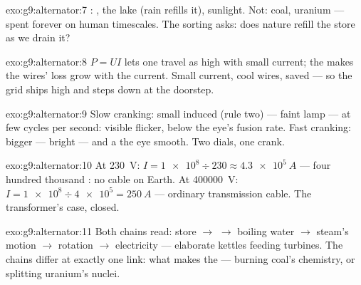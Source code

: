\begin{solution}{exo:g9:alternator:7}
: , the lake (rain refills it), sunlight. Not:
coal, uranium --- spent forever on human timescales. The
sorting asks: does nature refill the store as we drain it?
\end{solution}

\begin{solution}{exo:g9:alternator:8}
$P = U I$ lets one  travel as high  with small
current; the  makes the wires' loss grow with
the current. Small current, cool wires, saved  ---
so the grid ships high and steps down at the doorstep.
\end{solution}

\begin{solution}{exo:g9:alternator:9}
Slow cranking: small induced  (rule two) --- faint
lamp --- at few cycles per second: visible flicker, below
the eye's fusion rate. Fast cranking: bigger  ---
bright --- and a  the eye  smooth. Two dials,
one crank.
\end{solution}

\begin{solution}{exo:g9:alternator:10}
At \qty{230}{V}: $I = \num{1e8} \div 230 \approx
\qty{4.3e5}{A}$ --- four hundred thousand : no cable
on Earth. At \qty{400000}{V}: $I = \num{1e8} \div
\num{4e5} = \qty{250}{A}$ --- ordinary transmission cable.
The transformer's case, closed.
\end{solution}

\begin{solution}{exo:g9:alternator:11}
Both chains read: store $\to$  $\to$ boiling water
$\to$ steam's motion $\to$ rotation $\to$ electricity ---
elaborate kettles feeding turbines. The chains differ at
exactly one link: what makes the  --- burning coal's
chemistry, or splitting uranium's nuclei.
\end{solution}

